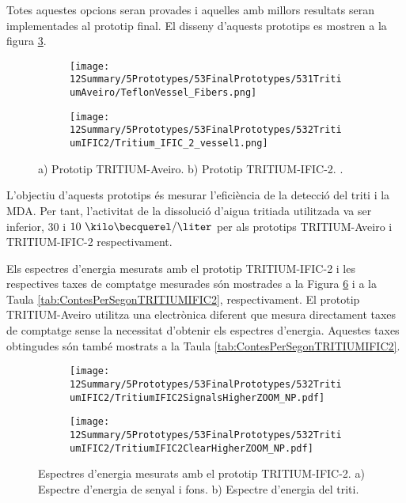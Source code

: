 Totes aquestes opcions seran provades i aquelles amb millors resultats seran implementades al prototip final. El disseny d'aquests prototips es mostren a la figura \ref{fig:PrototipsAveiroIFIC2}.
\begin{figure}
\centering
    \begin{subfigure}[b]{0.5\textwidth}
    \centering
    \texttt{[image: 12Summary/5Prototypes/53FinalPrototypes/531TritiumAveiro/TeflonVessel\_Fibers.png]}  
        \caption{}\label{subfig:PrototipAveiro}
    \end{subfigure}
    \hfill
    \begin{subfigure}[b]{0.5\textwidth}
    \centering
    \texttt{[image: 12Summary/5Prototypes/53FinalPrototypes/532TritiumIFIC2/Tritium\_IFIC\_2\_vessel1.png]}  
    \caption{\label{subfig:PrototipIFIC2}}
    \end{subfigure}
\caption{a) Prototip TRITIUM-Aveiro. b) Prototip TRITIUM-IFIC-2. \label{fig:PrototipsAveiroIFIC2}.}
\end{figure}
L'objectiu d'aquests prototips és mesurar l'eficiència de la detecció del triti i la MDA. Per tant, l'activitat de la dissolució d'aigua tritiada utilitzada va ser inferior, $30$ i $10~\kilo\becquerel/\liter$ per als prototips TRITIUM-Aveiro i TRITIUM-IFIC-2 respectivament.

Els espectres d'energia mesurats amb el prototip TRITIUM-IFIC-2 i les respectives taxes de comptatge mesurades són  mostrades a la Figura \ref{fig:EspectresEnergeticsTRITIUMIFIC2} i a la Taula \ref{tab:ContesPerSegonTRITIUMIFIC2}, respectivament. El prototip TRITIUM-Aveiro utilitza una electrònica diferent que mesura directament taxes de comptatge sense la necessitat d'obtenir els espectres d'energia. Aquestes taxes obtingudes són també mostrats a la Taula \ref{tab:ContesPerSegonTRITIUMIFIC2}.

\begin{figure}
\centering
    \begin{subfigure}[b]{1\textwidth}
    \centering
    \texttt{[image: 12Summary/5Prototypes/53FinalPrototypes/532TritiumIFIC2/TritiumIFIC2SignalsHigherZOOM\_NP.pdf]}  
    \caption{\label{subfig:EspectreEnergeticSenyalFonsTritiumIFIC2}}
    \end{subfigure}
    \hfill
    \begin{subfigure}[b]{1\textwidth}
    \centering
    \texttt{[image: 12Summary/5Prototypes/53FinalPrototypes/532TritiumIFIC2/TritiumIFIC2ClearHigherZOOM\_NP.pdf]}  
    \caption{\label{subfig:EspectreEnergeticTritiTritiumIFIC2}}
    \end{subfigure}
 \caption{Espectres d'energia mesurats amb el prototip TRITIUM-IFIC-2. a) Espectre d'energia de senyal i fons. b) Espectre d'energia del triti.}
 \label{fig:EspectresEnergeticsTRITIUMIFIC2}
\end{figure}

